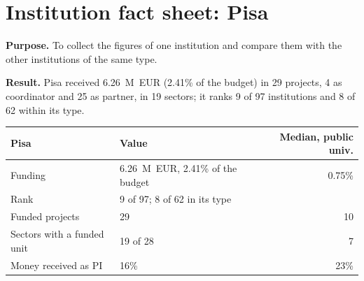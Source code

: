 \documentclass[11pt,a4paper]{article}
\begin{document}
\clearpage
\section{Institution fact sheet: Pisa}
\textbf{Purpose.} To collect the figures of one institution and compare them with the other institutions of the same type.

\textbf{Result.} Pisa received 6.26~M~EUR (2.41\% of the budget) in 29 projects, 4 as coordinator and 25 as partner, in 19 sectors; it ranks 9 of 97 institutions and 8 of 62 within its type.

\begin{table}[H]
\centering
\begin{tabular}{llr}
\toprule
Pisa & Value & Median, public univ. \\
\midrule
Funding & 6.26~M~EUR, 2.41\% of the budget & 0.75\% \\
Rank & 9 of 97; 8 of 62 in its type &  \\
Funded projects & 29 & 10 \\
Sectors with a funded unit & 19 of 28 & 7 \\
Money received as PI & 16\% & 23\% \\
\bottomrule
\end{tabular}
\end{table}
\end{document}
